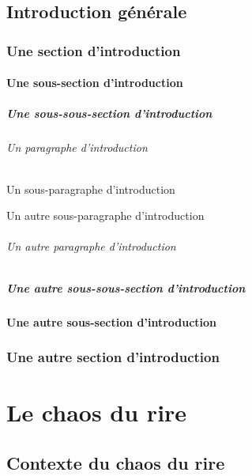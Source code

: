 \documentclass[12pt,space=onehalf,version=final]{yathesis}
\begin{document}
\chapter*{Introduction générale}
\lipsum[26]
\section{Une section d'introduction}
\lipsum[28]
\subsection{Une sous-section d'introduction}
\lipsum[29]
\subsubsection{Une sous-sous-section d'introduction}
\lipsum[30]
\paragraph{Un paragraphe d'introduction}
\lipsum[31]
\subparagraph{Un sous-paragraphe d'introduction}
\lipsum[32]
\subparagraph{Un autre sous-paragraphe d'introduction}
\lipsum[33]
\paragraph{Un autre paragraphe d'introduction}
\lipsum[34]
\subsubsection{Une autre sous-sous-section d'introduction}
\lipsum[35]
\subsection{Une autre sous-section d'introduction}
\lipsum[36]
\section{Une autre section d'introduction}
\lipsum[37]
%
%
\part{Le chaos du rire}
%
\chapter{Contexte du chaos du rire}
\end{document}
